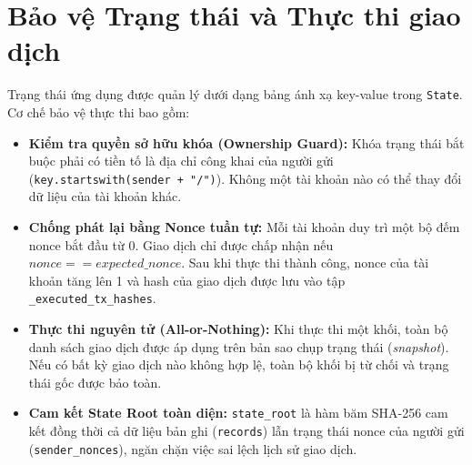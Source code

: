 \documentclass[10pt,a4paper]{report}
\begin{document}
\section{Bảo vệ Trạng thái và Thực thi giao dịch}
Trạng thái ứng dụng được quản lý dưới dạng bảng ánh xạ key-value trong \texttt{State}. Cơ chế bảo vệ thực thi bao gồm:
\begin{itemize}
  \item \textbf{Kiểm tra quyền sở hữu khóa (Ownership Guard):} Khóa trạng thái bắt buộc phải có tiền tố là địa chỉ công khai của người gửi (\texttt{key.startswith(sender + "/")}). Không một tài khoản nào có thể thay đổi dữ liệu của tài khoản khác.
  \item \textbf{Chống phát lại bằng Nonce tuần tự:} Mỗi tài khoản duy trì một bộ đếm nonce bắt đầu từ 0. Giao dịch chỉ được chấp nhận nếu $nonce == expected\_nonce$. Sau khi thực thi thành công, nonce của tài khoản tăng lên 1 và hash của giao dịch được lưu vào tập \texttt{\_executed\_tx\_hashes}.
  \item \textbf{Thực thi nguyên tử (All-or-Nothing):} Khi thực thi một khối, toàn bộ danh sách giao dịch được áp dụng trên bản sao chụp trạng thái (\emph{snapshot}). Nếu có bất kỳ giao dịch nào không hợp lệ, toàn bộ khối bị từ chối và trạng thái gốc được bảo toàn.
  \item \textbf{Cam kết State Root toàn diện:} \texttt{state\_root} là hàm băm SHA-256 cam kết đồng thời cả dữ liệu bản ghi (\texttt{records}) lẫn trạng thái nonce của người gửi (\texttt{sender\_nonces}), ngăn chặn việc sai lệch lịch sử giao dịch.
\end{itemize}
\end{document}
